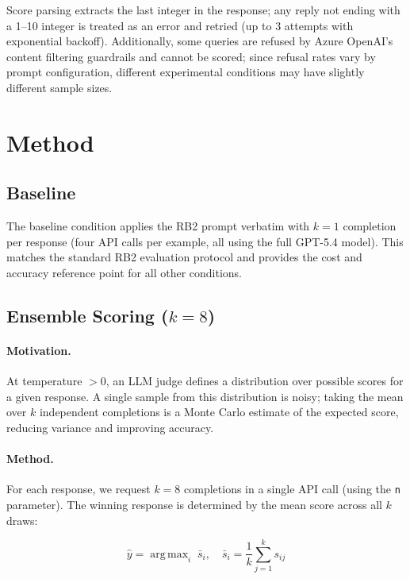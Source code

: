 \documentclass{article}
\DeclareMathOperator*{\argmax}{arg\,max}
\begin{document}
Score parsing extracts the last integer in the response; any reply not ending with a 1--10 integer is treated as an error and retried (up to 3 attempts with exponential backoff). Additionally, some queries are refused by Azure OpenAI's content filtering guardrails and cannot be scored; since refusal rates vary by prompt configuration, different experimental conditions may have slightly different sample sizes.

\section{Method}
\label{sec:methods}

\subsection{Baseline}
\label{sec:baseline}

The baseline condition applies the RB2 prompt verbatim with $k{=}1$ completion per response (four API calls per example, all using the full GPT-5.4 model). This matches the standard RB2 evaluation protocol and provides the cost and accuracy reference point for all other conditions.

\subsection{Ensemble Scoring ($k{=}8$)}
\label{sec:ensemble}

\paragraph{Motivation.} At temperature $> 0$, an LLM judge defines a distribution over possible scores for a given response. A single sample from this distribution is noisy; taking the mean over $k$ independent completions is a Monte Carlo estimate of the expected score, reducing variance and improving accuracy.

\paragraph{Method.} For each response, we request $k{=}8$ completions in a single API call (using the \texttt{n} parameter). The winning response is determined by the mean score across all $k$ draws:

\begin{equation}
\hat{y} = \argmax_{i}\; \bar{s}_i, \quad \bar{s}_i = \frac{1}{k}\sum_{j=1}^{k} s_{ij}
\label{eq:ensemble}
\end{equation}
\end{document}
